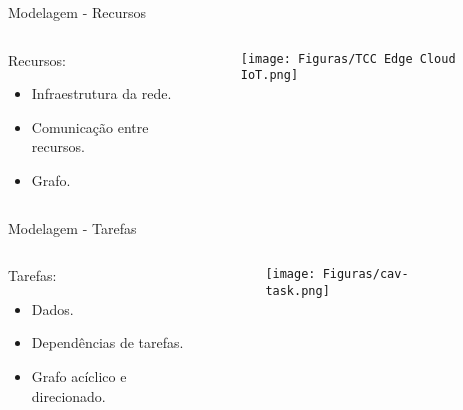 
\begin{frame}{Modelagem - Recursos}
    \begin{columns}[T]
        \begin{column}{.5\textwidth}
            Recursos:
            \begin{itemize}
                \item Infraestrutura da rede.
                \item Comunicação entre recursos.
                \item Grafo.
            \end{itemize}
        \end{column}

        \begin{column}{.5\textwidth}
            \begin{figure}
                \centering
                \texttt{[image: Figuras/TCC Edge Cloud IoT.png]}
            \end{figure}
        \end{column}
    \end{columns}
\end{frame}

\begin{frame}{Modelagem - Tarefas}
    \begin{columns}[T]
        \begin{column}{.5\textwidth}
            Tarefas:
            \begin{itemize}
                \item Dados.
                \item Dependências de tarefas.
                \item Grafo acíclico e direcionado.
            \end{itemize}
        \end{column}

        \begin{column}{.5\textwidth}
            \begin{figure}
                \centering
                \texttt{[image: Figuras/cav-task.png]}
            \end{figure}
        \end{column}
    \end{columns}
\end{frame}

